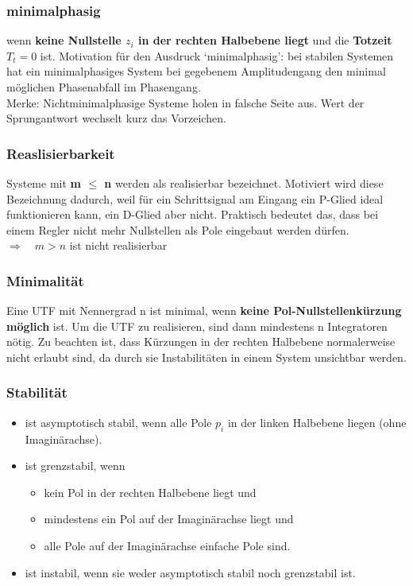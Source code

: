 \subsubsection{minimalphasig  }
wenn \textbf{keine Nullstelle $z_i$ in der rechten Halbebene liegt} und die \textbf{Totzeit $T_t = 0$} ist.
Motivation für den Ausdruck ‘minimalphasig’: bei stabilen Systemen hat ein
minimalphasiges System bei gegebenem Amplitudengang den minimal möglichen
Phasenabfall im Phasengang.\\
Merke: Nichtminimalphasige Systeme holen in falsche Seite aus. Wert der Sprungantwort wechselt kurz das Vorzeichen.

\subsubsection{Reaslisierbarkeit }
Systeme mit \textbf{m $\leq$ n} werden als realisierbar bezeichnet. Motiviert wird
diese Bezeichnung dadurch, weil für ein Schrittsignal am Eingang ein P-Glied ideal
funktionieren kann, ein D-Glied aber nicht. Praktisch bedeutet das, dass bei einem Regler nicht mehr Nullstellen als Pole
eingebaut werden dürfen. $\Rightarrow \quad m > n$ ist nicht realisierbar

\subsubsection{Minimalität }

Eine UTF mit Nennergrad n ist minimal, wenn \textbf{keine Pol-Nullstellenkürzung
möglich} ist. Um die UTF zu realisieren, sind dann mindestens n Integratoren nötig. Zu beachten ist, dass Kürzungen in
der rechten Halbebene normalerweise nicht erlaubt sind, da durch sie Instabilitäten
in einem System unsichtbar werden.

\subsubsection{Stabilität }
\begin{itemize}
\item  ist asymptotisch stabil, wenn
alle Pole $p_i$ in der linken Halbebene liegen (ohne Imaginärachse).
\item  ist grenzstabil, wenn
\begin{itemize}
\item kein Pol in der rechten Halbebene liegt und
\item mindestens ein Pol auf der Imaginärachse liegt und
\item alle Pole auf der Imaginärachse einfache Pole sind.
\end{itemize}
\item  ist instabil, wenn
sie weder asymptotisch stabil noch grenzstabil ist.
\end{itemize}


